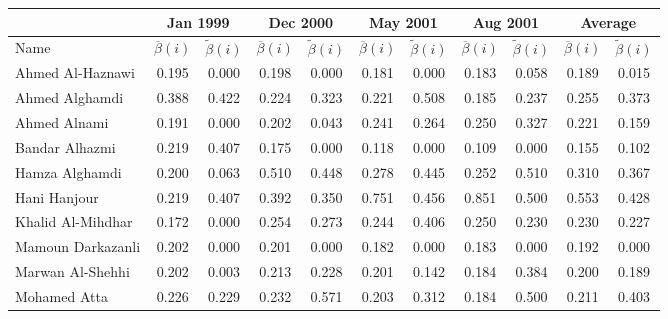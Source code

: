 \begin{subappendices}
\begin{table}
\begin{center}
\begin{tabular}{l cc cccccccc}
\toprule
 & \multicolumn{2}{c}{Jan 1999} & \multicolumn{2}{c}{Dec 2000} & \multicolumn{2}{c}{May 2001} & \multicolumn{2}{c}{Aug 2001} & \multicolumn{2}{c}{Average} \\[1ex]
\midrule
Name  & $\overline{\beta}(i)$ & $\widetilde{\beta}(i)$ & $\overline{\beta}(i)$ & $\widetilde{\beta}(i)$ & $\overline{\beta}(i)$  & $\widetilde{\beta}(i)$ & $\overline{\beta}(i)$ & $\widetilde{\beta}(i)$ & $\overline{\beta}(i)$ & $\widetilde{\beta}(i)$ \\
\midrule
Ahmed Al-Haznawi       & 0.195     & 0.000       & 0.198     & 0.000       & 0.181     & 0.000        & 0.183     & 0.058       & 0.189            & 0.015            \\
Ahmed Alghamdi         & 0.388     & 0.422       & 0.224     & 0.323       & 0.221     & 0.508        & 0.185     & 0.237       & 0.255            & 0.373            \\
Ahmed Alnami           & 0.191     & 0.000       & 0.202     & 0.043       & 0.241     & 0.264        & 0.250     & 0.327       & 0.221            & 0.159            \\
Bandar Alhazmi         & 0.219     & 0.407       & 0.175     & 0.000       & 0.118     & 0.000        & 0.109     & 0.000       & 0.155            & 0.102            \\
Hamza Alghamdi         & 0.200     & 0.063       & 0.510     & 0.448       & 0.278     & 0.445        & 0.252     & 0.510       & 0.310            & 0.367            \\
Hani Hanjour           & 0.219     & 0.407       & 0.392     & 0.350       & 0.751     & 0.456        & 0.851     & 0.500       & 0.553            & 0.428            \\
Khalid Al-Mihdhar      & 0.172     & 0.000       & 0.254     & 0.273       & 0.244     & 0.406        & 0.250     & 0.230       & 0.230            & 0.227            \\
Mamoun Darkazanli      & 0.202     & 0.000       & 0.201     & 0.000       & 0.182     & 0.000        & 0.183     & 0.000       & 0.192            & 0.000            \\
Marwan Al-Shehhi       & 0.202     & 0.003       & 0.213     & 0.228       & 0.201     & 0.142        & 0.184     & 0.384       & 0.200            & 0.189            \\
Mohamed Atta           & 0.226     & 0.229       & 0.232     & 0.571       & 0.203     & 0.312        & 0.184     & 0.500       & 0.211            & 0.403            \\

\end{tabular}
\end{center}
\end{table}
\end{subappendices}

